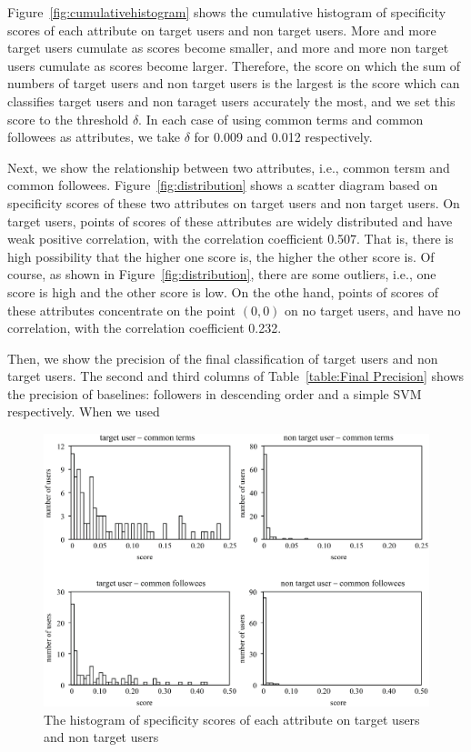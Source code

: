 Figure~\ref{fig:cumulativehistogram} shows the cumulative histogram of
specificity scores of each attribute on target users and non target
users.  More and more target users cumulate as scores become smaller,
and more and more non target users cumulate as scores become larger.
Therefore, the score on which the sum of numbers of target users and non
target users is the largest is the score which can classifies target
users and non taraget users accurately the most, and we set this score
to the threshold $\delta$.  In each case of using common terms and
common followees as attributes, we take $\delta$ for 0.009 and 0.012
respectively.

Next, we show the relationship between two attributes, i.e., common
tersm and common followees.  Figure~\ref{fig:distribution} shows a
scatter diagram based on specificity scores of these two attributes on
target users and non target users.  On target users, points of scores of
these attributes are widely distributed and have weak positive
correlation, with the correlation coefficient 0.507.  That is, there is
high possibility that the higher one score is, the higher the other
score is.  Of course, as shown in Figure~\ref{fig:distribution}, there
are some outliers, i.e., one score is high and the other score is low.
On the othe hand, points of scores of these attributes concentrate on
the point $(0, 0)$ on no target users, and have no correlation, with the
correlation coefficient 0.232.

Then, we show the precision of the final classification of target users
and non target users.  The second and third columns of
Table~\ref{table:Final Precision} shows the precision of baselines:
followers in descending order and a simple SVM respectively.  When we
used





{\footnotesize
\begin{figure}[t]
\begin{center}
\includegraphics[width=14cm]{images/histogram.eps}
 \caption{The histogram of specificity scores of each attribute on
 target users and non target users}
\label{fig:histogram}
\end{center}
\end{figure}
}

